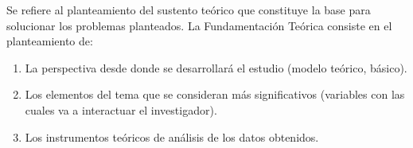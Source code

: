 Se refiere al planteamiento del sustento teórico que constituye la base para solucionar los problemas planteados. La Fundamentación Teórica consiste en el planteamiento de:

\begin{enumerate}
	\item La perspectiva desde donde se desarrollará el estudio (modelo teórico, básico).
	\item Los elementos del tema que se consideran más significativos (variables con las cuales va a interactuar el investigador).
	\item Los instrumentos teóricos de análisis de los datos obtenidos.
\end{enumerate}
